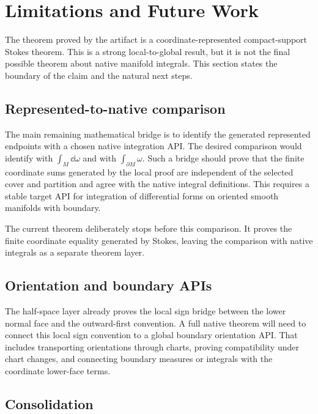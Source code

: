 \section{Limitations and Future Work}
\label{sec:limitations}

The theorem proved by the artifact is a coordinate-represented compact-support
Stokes theorem.  This is a strong local-to-global result, but it is not the
final possible theorem about native manifold integrals.  This section states
the boundary of the claim and the natural next steps.

\subsection{Represented-to-native comparison}

The main remaining mathematical bridge is to identify the generated represented
endpoints with a chosen native integration API.  The desired comparison would
identify  with \(\int_M\dd\omega\) and
 with
\(\int_{\partial M}\omega\).
Such a bridge should prove that the finite coordinate sums generated by the
local proof are independent of the selected cover and partition and agree with
the native integral definitions.  This requires a stable target API for
integration of differential forms on oriented smooth manifolds with boundary.

The current theorem deliberately stops before this comparison.  It proves the
finite coordinate equality generated by Stokes, leaving the comparison with
native integrals as a separate theorem layer.

\subsection{Orientation and boundary APIs}

The half-space layer already proves the local sign bridge between the lower
normal face and the outward-first convention.  A full native theorem will need
to connect this local sign convention to a global boundary orientation API.
That includes transporting orientations through charts, proving compatibility
under chart changes, and connecting boundary measures or integrals with the
coordinate lower-face terms.

\subsection{Consolidation}

